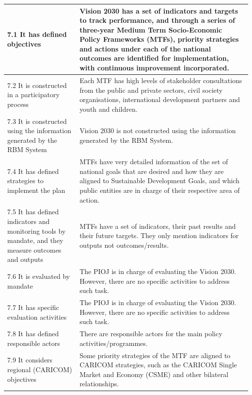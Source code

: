 \documentclass[
  10pt,
]{book}
\begin{document}
\begin{table}
\begin{tabular}[t]{l|l}
\hline
\hspace{1em}7.1 It has defined objectives & Vision 2030 has a set of indicators and targets to track performance, and through a series of three-year Medium Term Socio-Economic Policy Frameworks (MTFs), priority strategies and actions under each of the national outcomes are identified for implementation, with continuous improvement incorporated.\\
\hline
\hspace{1em}7.2 It is constructed in a participatory process & Each MTF has high levels of stakeholder consultations from the public and private sectors, civil society organisations, international development partners and youth and children.\\
\hline
\hspace{1em}7.3 It is constructed using the information generated by the RBM System & Vision 2030 is not constructed using the information generated by the RBM System.\\
\hline
\hspace{1em}7.4 It has defined strategies to implement the plan & MTFs have very detailed information of the set of national goals that are desired and how they are aligned to Sustainable Development Goals, and which public entities are in charge of their respective area of action.\\
\hline
\hspace{1em}7.5 It has defined indicators and monitoring tools by mandate, and they measure outcomes and outputs & MTFs have a set of indicators, their past results and their future targets. They only mention indicators for outputs not outcomes/results.\\
\hline
\hspace{1em}7.6 It is evaluated by mandate & The PIOJ is in charge of evaluating the Vision 2030. However, there are no specific activities to address such task.\\
\hline
\hspace{1em}7.7 It has specific evaluation activities & The PIOJ is in charge of evaluating the Vision 2030. However, there are no specific activities to address such task.\\
\hline
\hspace{1em}7.8 It has defined responsible actors & There are responsible actors for the main policy activities/programmes.\\
\hline
\hspace{1em}7.9 It considers regional (CARICOM) objectives & Some priority strategies of the MTF are aligned to CARICOM strategies, such as the CARICOM Single Market and Economy (CSME) and other bilateral relationships.\\

\end{tabular}
\end{table}
\end{document}
